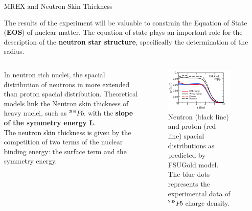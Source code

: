 \documentclass[9pt,a4paper]{beamer}
\begin{document}
\begin{frame}{MREX and Neutron Skin Thickness}

The results of the experiment will be valuable to constrain the Equation of 	State (\textbf{EOS}) of nuclear matter. The equation of state plays an important role for the description of the \textbf{neutron star structure}, specifically the determination of the radius.
\begin{columns}[T]
\begin{column}{.5\textwidth}
In neutron rich nuclei, the spacial distribution of neutrons in more extended than proton spacial distribution.
Theoretical models link the Neutron skin thickness of heavy nuclei, such as $^{208}Pb$, with the \textbf{slope of the symmetry energy L}.
\\ \medskip
The neutron skin thickness is given by the competition of two terms of the nuclear binding energy: the surface term and the symmetry energy.
\end{column}
\begin{column}{.5\textwidth}
\begin{figure}
\centering
\includegraphics[width = 1\textwidth]{figures/SpacialDistribution.png}
\caption{Neutron (black line) and proton (red line) spacial distributions as predicted by FSUGold model. The blue dots represents the experimental data of $^{208}Pb$ charge density.}
\end{figure}
\end{column}
\end{columns}
\end{frame}
\end{document}
